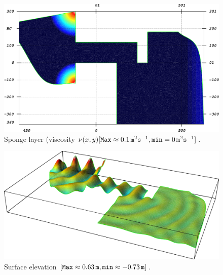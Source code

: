 \begin{figure}[htb!]
{\centering
\includegraphics[width=\largefig]{chapters/lopes/pdf/sponge.pdf}
\caption{Sponge layer (viscosity $\nu(x,y) [{\tt Max} \approx 0.1\,{\tt m}^2{\tt
s}^{-1}, {\tt min}=0 \,{\tt m}^2{\tt s}^{-1}]$.}\label{lopes:fig:sponge}\par}
\end{figure}
\begin{figure}[!htb]
{\centering
\includegraphics[width=\largefig]{chapters/lopes/pdf/eta.pdf}
\caption{Surface elevation $[{\tt Max}\approx 0.63\,{\tt
m}, {\tt min}\approx-0.73\,{\tt m}]$.}\label{lopes:fig:elevation}\par}
\end{figure}
